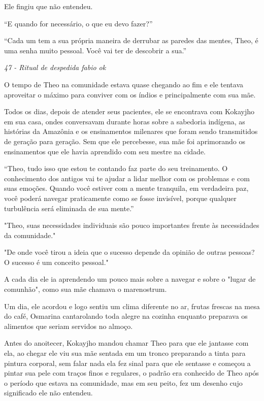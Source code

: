 Ele fingiu que não entendeu.

``E quando for necessário, o que eu devo fazer?''

``Cada um tem a sua própria maneira de derrubar as paredes das mentes,
Theo, é uma senha muito pessoal. Você vai ter de descobrir a sua.''

\asterisc

\emph{47 - Ritual de despedida fabio ok}

O tempo de Theo na comunidade estava quase chegando ao fim e ele tentava
aproveitar o máximo para conviver com os índios e principalmente com sua
mãe.

Todos os dias, depois de atender seus pacientes, ele se encontrava com
Kokayjho em sua casa, ondes conversavam durante horas sobre a sabedoria
indígena, as histórias da Amazônia e os ensinamentos milenares que foram
sendo transmitidos de geração para geração. Sem que ele percebesse, sua
mãe foi aprimorando os ensinamentos que ele havia aprendido com seu
mestre na cidade.

``Theo, tudo isso que estou te contando faz parte do seu treinamento. O
conhecimento dos antigos vai te ajudar a lidar melhor com os problemas e
com suas emoções. Quando você estiver com a mente tranquila, em
verdadeira paz, você poderá navegar praticamente como se fosse
invisível, porque qualquer turbulência será eliminada de sua mente.''

"Theo, suas necessidades individuais são pouco importantes frente às
necessidades da comunidade."

"De onde você tirou a ideia que o sucesso depende da opinião de outras
pessoas? O sucesso é um conceito pessoal."

A cada dia ele ia aprendendo um pouco mais sobre a navegar e sobre o
"lugar de comunhão", como sua mãe chamava o marenostrum.

Um dia, ele acordou e logo sentiu um clima diferente no ar, frutas
frescas na mesa do café, Osmarina cantarolando toda alegre na cozinha
enquanto preparava os alimentos que seriam servidos no almoço.

Antes do anoitecer, Kokayjho mandou chamar Theo para que ele jantasse
com ela, ao chegar ele viu sua mãe sentada em um tronco preparando a
tinta para pintura corporal, sem falar nada ela fez sinal para que ele
sentasse e começou a pintar sua pele com traços finos e regulares, o
padrão era conhecido de Theo após o período que estava na comunidade,
mas em seu peito, fez um desenho cujo significado ele não entendeu.

